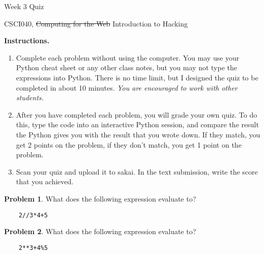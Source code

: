 \documentclass[10pt]{article}
\theoremstyle{definition}
\newtheorem{problem}{Problem}
\begin{document}
\begin{center}
    {
\Large
Week 3 Quiz
}

    \vspace{0.1in}
    CSCI040, \sout{Computing for the Web} Introduction to Hacking

    \vspace{0.1in}
\end{center}

\vspace{0.15in}
%
%

\noindent\textbf{Instructions.}
\begin{enumerate}
    \item
        Complete each problem without using the computer.  
        You may use your Python cheat sheet or any other class notes,
        but you may not type the expressions into Python.
        There is no time limit, but I designed the quiz to be completed in about 10 minutes.
        \emph{You are encouraged to work with other students.}
\item
After you have completed each problem, you will grade your own quiz.
To do this, type the code into an interactive Python session,
and compare the result the Python gives you with the result that you wrote down.
If they match, you get 2 points on the problem,
if they don't match, you get 1 point on the problem.
\item
Scan your quiz and upload it to sakai.
In the text submission, write the score that you achieved.
\end{enumerate}
\vspace{0.15in}

\begin{problem}
    What does the following expression evaluate to?
\end{problem}
\begin{lstlisting}
    2//3*4+5
\end{lstlisting}
\vspace{1.5in}

\begin{problem}
    What does the following expression evaluate to?
\end{problem}
\begin{lstlisting}
    2**3+4%5
\end{lstlisting}
\vspace{1.5in}
\end{document}

